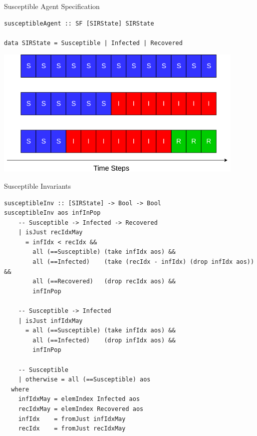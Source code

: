 \documentclass{beamer} %
\begin{document}
\begin{frame}[fragile]{Susceptible Agent Specification}
\begin{block}{}
\begin{verbatim}
susceptibleAgent :: SF [SIRState] SIRState

data SIRState = Susceptible | Infected | Recovered
\end{verbatim}
\end{block}

\begin{center}
\includegraphics[width=0.9\textwidth]{./fig/property_susceptible_output.png}
\end{center}
\end{frame}

\begin{frame}[fragile]{Susceptible Invariants}
\begin{verbatim}
susceptibleInv :: [SIRState] -> Bool -> Bool
susceptibleInv aos infInPop
    -- Susceptible -> Infected -> Recovered
    | isJust recIdxMay 
      = infIdx < recIdx &&  
        all (==Susceptible) (take infIdx aos) && 
        all (==Infected)    (take (recIdx - infIdx) (drop infIdx aos)) && 
        all (==Recovered)   (drop recIdx aos) &&
        infInPop 

    -- Susceptible -> Infected
    | isJust infIdxMay 
      = all (==Susceptible) (take infIdx aos) &&
        all (==Infected)    (drop infIdx aos) &&
        infInPop

    -- Susceptible 
    | otherwise = all (==Susceptible) aos
  where
    infIdxMay = elemIndex Infected aos
    recIdxMay = elemIndex Recovered aos
    infIdx    = fromJust infIdxMay
    recIdx    = fromJust recIdxMay
\end{verbatim}
\end{frame}
\end{document}
